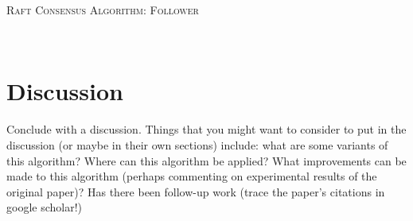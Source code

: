 \documentclass[11pt]{article}
\begin{document}
\begin{algorithm}[H]\caption{\textsc{Raft Consensus Algorithm: Follower}}
 \begin{algorithmic}[1]
  
 	  
 \EndFunction{}
   
 	 
 	 
 \EndFunction {}
  {}
	 
 \EndFunction\
\end{algorithmic}
\end{algorithm}

\section{Discussion}
Conclude with a discussion.  Things that you might want to consider to put in 
the discussion (or maybe in their own sections) include: what are some variants 
of this algorithm? Where can this algorithm be applied?  What improvements can 
be made to this algorithm (perhaps commenting on experimental results of the 
original paper)?  Has there been follow-up work (trace the paper's citations in 
google scholar!)
\end{document}
